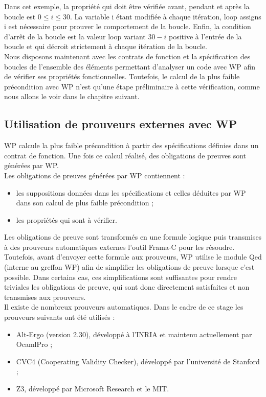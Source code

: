 Dans cet exemple, la propriété qui doit être vérifiée avant, pendant et après la boucle est $ 0 \leq i \leq 30 $. La variable i étant modifiée à chaque itération, loop assigns i est nécessaire pour prouver le comportement de la boucle. Enfin, la condition d'arrêt de la boucle est  la valeur loop variant $ 30 - i$ positive à l'entrée de la boucle et qui décroit strictement à chaque itération de la boucle.
\\
\noindent
Nous disposons maintenant avec les contrats de fonction et la spécification des boucles de l'ensemble des éléments permettant d'analyser un code avec WP afin de vérifier ses propriétés fonctionnelles. Toutefois, le calcul de la plus faible précondition avec WP n'est qu'une étape préliminaire à cette vérification, comme nous allons le voir dans le chapitre suivant.

\subsection{Utilisation de prouveurs externes avec WP}\label{prouveurs}

WP calcule la plus faible précondition à partir des spécifications définies dans un contrat de fonction. Une fois ce calcul réalisé, des obligations de preuves sont générées par WP.
\\
\noindent Les obligations de preuves générées par WP contiennent :
\begin{itemize}
	\item les suppositions données dans les spécifications et celles déduites par WP dans son calcul de plus faible précondition ;
	\item les propriétés qui sont à vérifier.
\end{itemize}

\noindent  Les obligations de preuve sont transformés en une formule logique puis transmises à des prouveurs automatiques externes l'outil Frama-C pour les résoudre. Toutefois, avant d’envoyer cette formule aux prouveurs, WP utilise le module Qed (interne au greffon WP) afin de simplifier les obligations de preuve lorsque c'est possible. Dans certains cas, ces simplifications sont suffisantes pour rendre triviales les obligations de preuve, qui sont donc directement satisfaites et non transmises aux prouveurs.
\\
\noindent Il existe de nombreux prouveurs automatiques. Dans le cadre de ce stage les prouveurs suivants ont été utilisés  :

\begin{itemize}
	\item Alt-Ergo (version 2.30), développé à l'INRIA et maintenu actuellement par OcamlPro ;
	\item CVC4 (Cooperating Validity Checker), développé par l'université de Stanford ;
	\item Z3, développé par Microsoft Research et le MIT.
\end{itemize}


